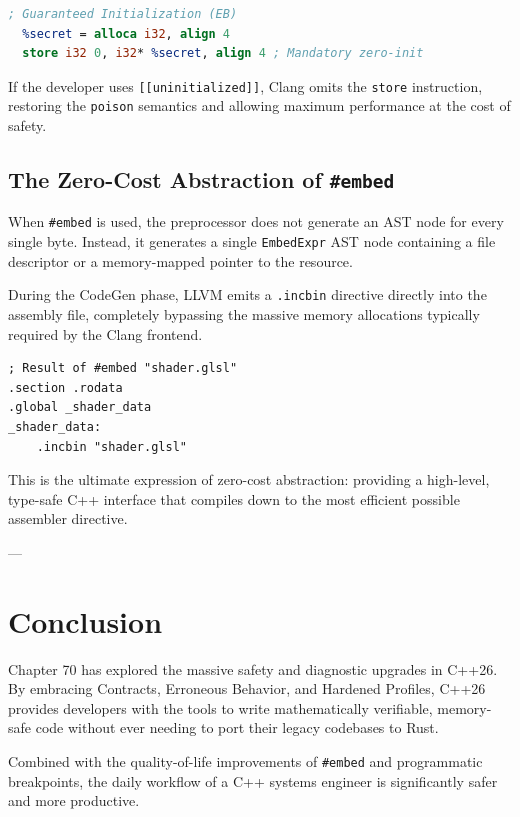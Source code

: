 {{{{\begin{lstlisting}[language=llvm]
; Guaranteed Initialization (EB)
  %secret = alloca i32, align 4
  store i32 0, i32* %secret, align 4 ; Mandatory zero-init
\end{lstlisting}

If the developer uses \texttt{[[uninitialized]]}, Clang omits the \texttt{store} instruction, restoring the \texttt{poison} semantics and allowing maximum performance at the cost of safety.

\subsection{The Zero-Cost Abstraction of \texttt{#embed}}

When \texttt{#embed} is used, the preprocessor does not generate an AST node for every single byte. Instead, it generates a single \texttt{EmbedExpr} AST node containing a file descriptor or a memory-mapped pointer to the resource.

During the CodeGen phase, LLVM emits a \texttt{.incbin} directive directly into the assembly file, completely bypassing the massive memory allocations typically required by the Clang frontend.

\begin{lstlisting}[language={[x86masm]Assembler}]
; Result of #embed "shader.glsl"
.section .rodata
.global _shader_data
_shader_data:
    .incbin "shader.glsl"
\end{lstlisting}

This is the ultimate expression of zero-cost abstraction: providing a high-level, type-safe C++ interface that compiles down to the most efficient possible assembler directive.

---

\section{Conclusion}

Chapter 70 has explored the massive safety and diagnostic upgrades in C++26. By embracing Contracts, Erroneous Behavior, and Hardened Profiles, C++26 provides developers with the tools to write mathematically verifiable, memory-safe code without ever needing to port their legacy codebases to Rust.

Combined with the quality-of-life improvements of \texttt{#embed} and programmatic breakpoints, the daily workflow of a C++ systems engineer is significantly safer and more productive.

}}}}
